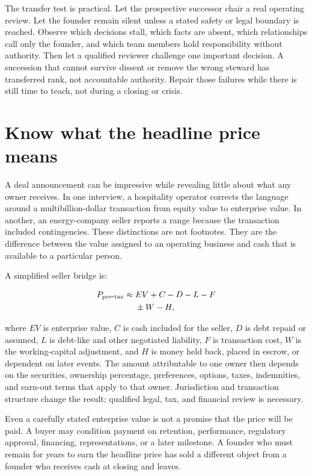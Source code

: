 The transfer test is practical. Let the prospective successor chair a real
operating review. Let the founder remain silent unless a stated safety or legal
boundary is reached. Observe which decisions stall, which facts are absent,
which relationships call only the founder, and which team members hold
responsibility without authority. Then let a qualified reviewer challenge one
important decision. A succession that cannot survive dissent or remove the
wrong steward has transferred rank, not accountable authority. Repair those
failures while there is still time to teach, not during a closing or crisis.

\section{Know what the headline price means}

A deal announcement can be impressive while revealing little about what any
owner receives. In one interview, a hospitality operator corrects the language
around a multibillion-dollar transaction from equity value to enterprise value.
In another, an energy-company seller reports a range because the transaction
included contingencies. These distinctions are not footnotes. They are the
difference between the value assigned to an operating business and cash that is
available to a particular person.

A simplified seller bridge is:

\begin{align}
P_{\mathrm{pre\mbox{-}tax}} \approx{}& EV + C - D - L - F \notag\\
&{}\pm W - H,
\end{align}

where \(EV\) is enterprise value, \(C\) is cash included for the seller,
\(D\) is debt repaid or assumed, \(L\) is debt-like and other negotiated
liability, \(F\) is transaction cost, \(W\) is the working-capital adjustment,
and \(H\) is money held back, placed in escrow, or dependent on later events.
The amount attributable to one owner then depends on the securities, ownership
percentage, preferences, options, taxes, indemnities, and earn-out terms that
apply to that owner. Jurisdiction and transaction structure change the result;
qualified legal, tax, and financial review is necessary.

Even a carefully stated enterprise value is not a promise that the price will
be paid. A buyer may condition payment on retention, performance, regulatory
approval, financing, representations, or a later milestone. A founder who must
remain for years to earn the headline price has sold a different object from a
founder who receives cash at closing and leaves.

